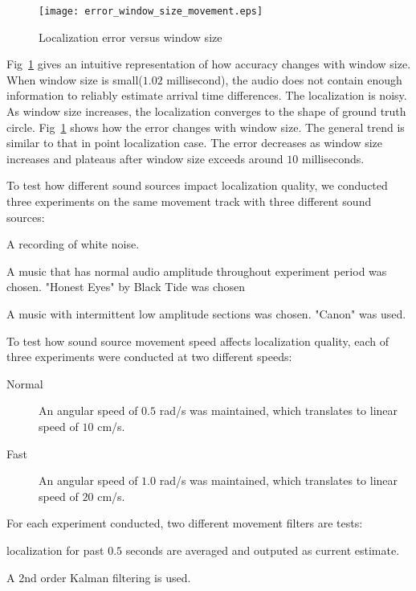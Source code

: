 \begin{figure}[]
\texttt{[image: error\_window\_size\_movement.eps]}
\caption{Localization error versus window size}
\label{fig:err_win_circle}
\end{figure}


Fig~\ref{fig:err_win_circle} gives an intuitive representation of how accuracy changes with window size. When window size is small($1.02$ millisecond), the audio does not contain enough information to reliably estimate arrival time differences. The localization is noisy. As window size increases, the localization converges to the shape of ground truth circle. Fig~\ref{fig:err_win_circle} shows how the error changes with window size. The general trend is similar to that in point localization case. The error decreases as window size increases and plateaus after window size exceeds around $10$ milliseconds.

To test how different sound sources impact localization quality, we conducted three experiments on the same movement track with three different sound sources:

\begin{description}

\item[White Noise] A recording of white noise.

\item[Music A] A music that has normal audio amplitude throughout experiment period was chosen. "Honest Eyes" by Black Tide was chosen 

\item[Music B] A music with intermittent low amplitude sections was chosen. "Canon" was used.

\end{description} 

To test how sound source movement speed affects localization quality, each of three experiments were conducted at two different speeds:
\begin{description}
\item[Normal] An angular speed of $0.5$ rad/s was maintained, which translates to linear speed of $10$ cm/s.
\item[Fast] An angular speed of $1.0$ rad/s was maintained, which translates to linear speed of $20$ cm/s.
\end{description}

For each experiment conducted, two different movement filters are tests:
\begin{description}
\item[Averaging filter] localization for past $0.5$ seconds are averaged and outputed as current estimate.
\item[Kalman filter] A 2nd order Kalman filtering is used.
\end{description}

